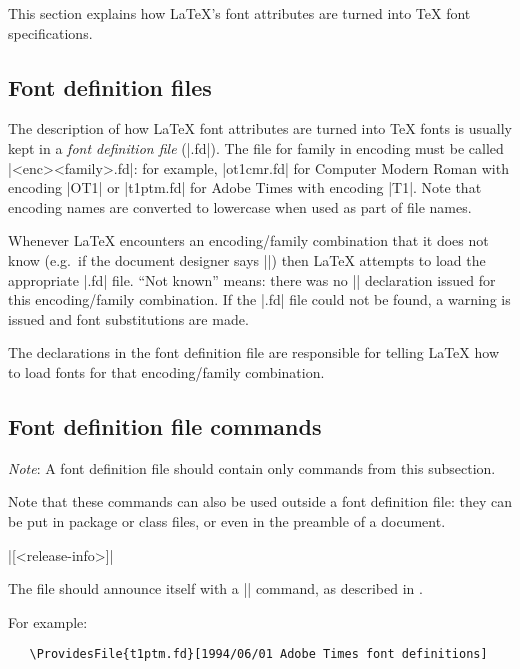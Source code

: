 \documentclass{ltxguide}[1995/11/28]
\begin{document}
This section explains how \LaTeX's font attributes are turned into
\TeX{} font specifications.


\subsection{Font definition files}

The description of how \LaTeX{} font attributes are turned into \TeX{}
fonts is usually kept in a \emph{font definition file} (|.fd|).  The
file for family  in encoding  must be called
|<enc><family>.fd|: for example, |ot1cmr.fd| for Computer Modern Roman
with encoding |OT1| or |t1ptm.fd| for Adobe Times with encoding |T1|.
Note that encoding names are converted to lowercase when used as part of
file names.

Whenever \LaTeX{} encounters an encoding/family combination that it does
not know (e.g.~if the document designer says
|\selectfont|) then \LaTeX{} attempts to load the
appropriate |.fd| file.  ``Not known'' means: there was no
|\DeclareFontFamily| declaration issued for this encoding/family
combination.  If the |.fd| file could not be found, a warning is issued
and font substitutions are made.

The declarations in the font definition file are responsible for telling
\LaTeX{} how to load fonts for that encoding/family combination.



\subsection{Font definition file commands}

\emph{Note}: A font definition file should contain only commands from
this subsection.

Note that these commands can also be used outside a font definition
file: they can be put in package or class files, or even in the preamble
of a document.

\begin{decl}
  |[<release-info>]|
\end{decl}
The file should announce itself with a |\ProvidesFile| command, as
described in \emph{\clsguide}.

\newpage

For example:
\begin{verbatim}
   \ProvidesFile{t1ptm.fd}[1994/06/01 Adobe Times font definitions]
\end{verbatim}
\end{document}
